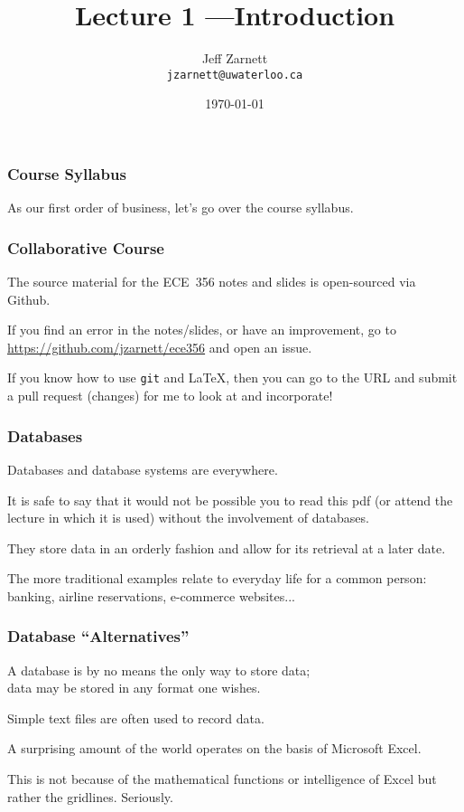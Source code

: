 

\title{Lecture 1 ---Introduction}

\author{Jeff Zarnett \\ \small \texttt{jzarnett@uwaterloo.ca}}
\date{\today}




\begin{frame}
  \titlepage

 \end{frame}

\begin{frame}
\frametitle{Course Syllabus}

As our first order of business, let's go over the course syllabus.

\end{frame}

\begin{frame}
\frametitle{Collaborative Course}

The source material for the ECE~356 notes and slides is open-sourced via Github. 

If you find an error in the notes/slides, or have an improvement, go to \url{https://github.com/jzarnett/ece356} and open an issue. 

If you know how to use \texttt{git} and \LaTeX, then you can go to the URL and submit a pull request (changes) for me to look at and incorporate!


\end{frame}



\begin{frame}
\frametitle{Databases}

Databases and database systems are everywhere. 

It is safe to say that it would not be possible you to read this pdf (or attend the lecture in which it is used) without the involvement of databases. 

They store data in an orderly fashion and allow for its retrieval at a later date.

The more traditional examples relate to everyday life for a common person: banking, airline reservations, e-commerce websites...

\end{frame}



\begin{frame}
\frametitle{Database ``Alternatives''}
A database is by no means the only way to store data; \\
\quad data may be stored in any format one wishes. 

Simple text files are often used to record data. 

A surprising amount of the world operates on the basis of Microsoft Excel. 

This is not because of the mathematical functions or intelligence of Excel but rather the gridlines. Seriously.

\end{frame}



